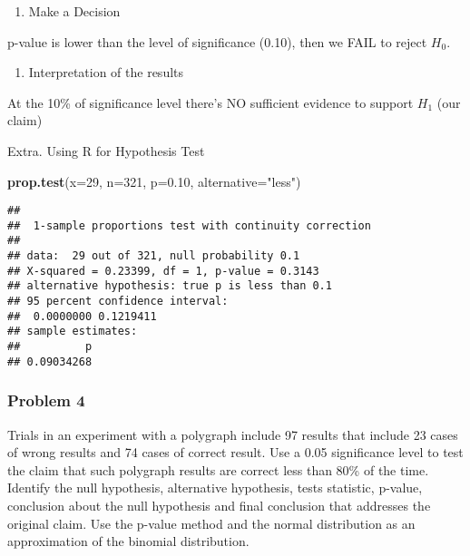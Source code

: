 \documentclass[
]{article}
\newenvironment{Shaded}{\begin{snugshade}}{\end{snugshade}}
\newcommand{\AttributeTok}[1]{\textcolor[rgb]{0.13,0.29,0.53}{#1}}
\newcommand{\DecValTok}[1]{\textcolor[rgb]{0.00,0.00,0.81}{#1}}
\newcommand{\FloatTok}[1]{\textcolor[rgb]{0.00,0.00,0.81}{#1}}
\newcommand{\FunctionTok}[1]{\textcolor[rgb]{0.13,0.29,0.53}{\textbf{#1}}}
\newcommand{\NormalTok}[1]{#1}
\newcommand{\StringTok}[1]{\textcolor[rgb]{0.31,0.60,0.02}{#1}}
\providecommand{\tightlist}{%
  \setlength{\itemsep}{0pt}\setlength{\parskip}{0pt}}
\begin{document}
\begin{enumerate}
\def\labelenumi{\arabic{enumi}.}
\setcounter{enumi}{3}
\tightlist
\item
  Make a Decision
\end{enumerate}

p-value is lower than the level of significance (0.10), then we FAIL to
reject \(H_{0}\).

\begin{enumerate}
\def\labelenumi{\arabic{enumi}.}
\setcounter{enumi}{4}
\tightlist
\item
  Interpretation of the results
\end{enumerate}

At the 10\% of significance level there's NO sufficient evidence to
support \(H_{1}\) (our claim)

Extra. Using R for Hypothesis Test

\begin{Shaded}
\begin{Highlighting}[]
\FunctionTok{prop.test}\NormalTok{(}\AttributeTok{x=}\DecValTok{29}\NormalTok{, }\AttributeTok{n=}\DecValTok{321}\NormalTok{, }\AttributeTok{p=}\FloatTok{0.10}\NormalTok{, }\AttributeTok{alternative=}\StringTok{"less"}\NormalTok{)}
\end{Highlighting}
\end{Shaded}

\begin{verbatim}
## 
##  1-sample proportions test with continuity correction
## 
## data:  29 out of 321, null probability 0.1
## X-squared = 0.23399, df = 1, p-value = 0.3143
## alternative hypothesis: true p is less than 0.1
## 95 percent confidence interval:
##  0.0000000 0.1219411
## sample estimates:
##          p 
## 0.09034268
\end{verbatim}

\hypertarget{problem-4}{%
\subsubsection{Problem 4}\label{problem-4}}

Trials in an experiment with a polygraph include 97 results that include
23 cases of wrong results and 74 cases of correct result. Use a 0.05
significance level to test the claim that such polygraph results are
correct less than 80\% of the time. Identify the null hypothesis,
alternative hypothesis, tests statistic, p-value, conclusion about the
null hypothesis and final conclusion that addresses the original claim.
Use the p-value method and the normal distribution as an approximation
of the binomial distribution.
\end{document}
